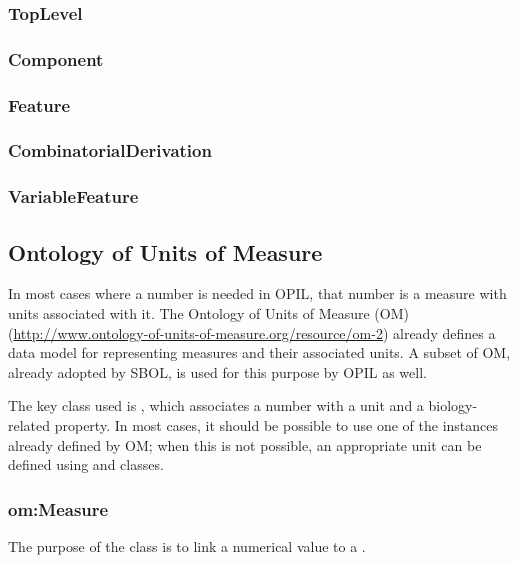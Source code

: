 \subsubsection{TopLevel}

\subsubsection{Component}

\subsubsection{Feature}

\subsubsection{CombinatorialDerivation}

\subsubsection{VariableFeature}



\subsection{Ontology of Units of Measure}

In most cases where a number is needed in OPIL, that number is a measure with units associated with it.
The Ontology of Units of Measure (OM) (\url{http://www.ontology-of-units-of-measure.org/resource/om-2}) already defines a data model for representing measures and their associated units. 
A subset of OM, already adopted by SBOL, is used for this purpose by OPIL as well.

The key class used is , which associates a number with a unit and a biology-related property.
In most cases, it should be possible to use one of the  instances already defined by OM; when this is not possible, an appropriate unit can be defined using  and  classes.

\subsubsection{om:Measure} \label{sec:om:Measure}

The purpose of the  class is to link a numerical value to a . 

